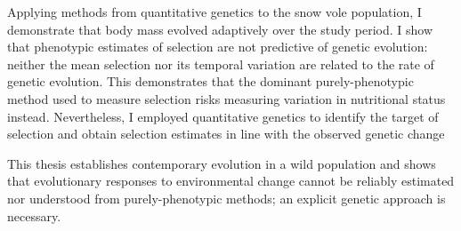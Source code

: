 \begin{summary}
Applying methods from quantitative genetics to the snow vole population, I demonstrate that body mass evolved adaptively over the study period. I show that phenotypic estimates of selection are not predictive of genetic evolution: neither the mean selection nor its temporal variation are related to the rate of genetic evolution. This demonstrates that the dominant purely-phenotypic method used to measure selection risks measuring variation in nutritional status instead. Nevertheless, I employed quantitative genetics to identify the target of selection and obtain selection estimates in line with the observed genetic change 

This thesis establishes contemporary evolution in a wild population and shows that evolutionary responses to environmental change cannot be reliably estimated nor understood from purely-phenotypic methods; an explicit genetic approach is necessary. 

\end{summary}
